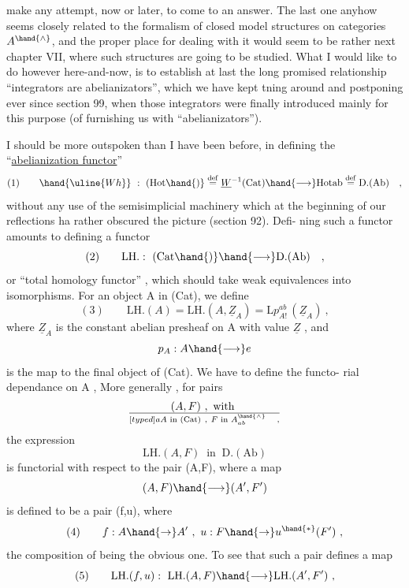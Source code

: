 
make any attempt,  now or later,  to come to an answer.  The last one
anyhow seems closely related to the formalism of closed model structures
on categories $A^{\hand{\wedge}}$,  and the proper place for dealing with it would seem
to be rather next chapter VII,  where such structures are going to be
 studied.  What I would like to do however here-and-now,  is
to establish at last the long promised relationship ``integrators are
abelianizators'',  which we have kept tning around and postponing
ever since section 99,  when those integrators were finally introduced
mainly for this purpose (of furnishing us with ``abelianizators'').

 I should be more outspoken than I have been before,   in
defining the ``\uline{abelianization functor}'' 
\[ (1) \qquad \hand{\uline{Wh}} \ : \ (\mathrm{Hot}\hand{)} \overset{\mathrm{def}}{=} \underline{W}^{-1}(\mathrm{Cat}) \hand{\longrightarrow} \mathrm{Hotab} \overset{\mathrm{def}}{=} \mathrm{D.(Ab)} \quad , \]
without any use of the semisimplicial machinery\deleted{,} which\hand{,} at the beginning
of our reflections\hand{,} ha rather obscured the picture\deleted{,} (section 92).  Defi-%
ning such a functor amounts to defining a functor
\[ (2) \qquad \mathrm{LH.} : \ (\mathrm{Cat}\hand{)} \hand{\longrightarrow} \mathrm{D.(Ab)} \quad , \]
or ``total homology functor'' ,  which should take weak equivalences into
isomorphisms.  For an object A in (Cat),  we define
\[ (3) \qquad \mathrm{LH.}(A) = \mathrm{LH.}(A,\underline{Z}_A) = \mathrm{L}p^{ab}_{A!}\,(\underline{Z}_A) \ , \]
where $\underline{Z}_A$ is the constant abelian presheaf on A with value $\underline{Z}$ ,  and
\[ p_A : A \hand{\longrightarrow} e \]
is the map to the final object of (Cat).  We have to define the functo-%
rial dependance on A ,  More generally ,  for pairs
\[ (A,F) \ , \ \text{with } \over[typed]{a}{A} \text{ in (Cat)} \ , \ F \text{ in } A^{\hand{\wedge}}_{ab} \quad , \]
the expression
\[ \mathrm{LH.}(A,F) \ \text{ in } \ \mathrm{D.(Ab)} \]
is functorial with respect to the pair (A,F),  where a map
\[ (A,F) \hand{\longrightarrow} (A',F') \]
is defined to be a pair    (f,u),  where
\[ (4) \qquad f: A \hand{\to} A' \ , \ u: F \hand{\to} u^{\hand{*}}(F') \ , \]
the composition of   being the obvious  one.  To see that such
a pair  defines a map
\[ (5) \qquad \mathrm{LH.}(f,u): \ \mathrm{LH.}(A,F) \hand{\longrightarrow} \mathrm{LH.}(A',F') \ , \]


